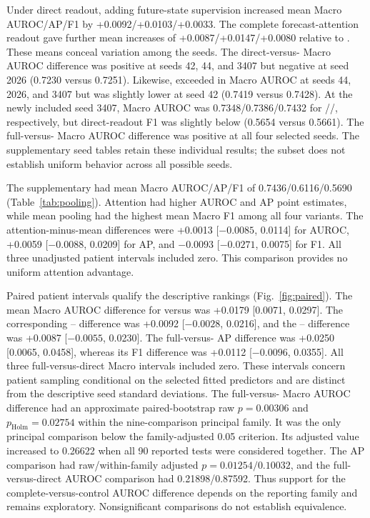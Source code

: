 Under direct readout, adding future-state supervision increased mean Macro AUROC/AP/F1 by +0.0092/+0.0103/+0.0033. The complete forecast-attention readout gave further mean increases of +0.0087/+0.0147/+0.0080 relative to \direct{}. These means conceal variation among the seeds. The direct-versus-\nojepa{} Macro AUROC difference was positive at seeds 42, 44, and 3407 but negative at seed 2026 (0.7230 versus 0.7251). Likewise, \fullmodel{} exceeded \direct{} in Macro AUROC at seeds 44, 2026, and 3407 but was slightly lower at seed 42 (0.7419 versus 0.7428). At the newly included seed 3407, Macro AUROC was 0.7348/0.7386/0.7432 for \nojepa{}/\direct{}/\fullmodel{}, respectively, but direct-readout F1 was slightly below \nojepa{} (0.5654 versus 0.5661). The full-versus-\nojepa{} Macro AUROC difference was positive at all four selected seeds. The supplementary seed tables retain these individual results; the subset does not establish uniform behavior across all possible seeds.

The supplementary \meanmodel{} had mean Macro AUROC/AP/F1 of 0.7436/0.6116/0.5690 (Table~\ref{tab:pooling}). Attention had higher AUROC and AP point estimates, while mean pooling had the highest mean Macro F1 among all four variants. The attention-minus-mean differences were +0.0013 [$-0.0085$, 0.0114] for AUROC, +0.0059 [$-0.0088$, 0.0209] for AP, and $-0.0093$ [$-0.0271$, 0.0075] for F1. All three unadjusted patient intervals included zero. This comparison provides no uniform attention advantage.

Paired patient intervals qualify the descriptive rankings (Fig.~\ref{fig:paired}). The mean Macro AUROC difference for \fullmodel{} versus \nojepa{} was +0.0179 [0.0071, 0.0297]. The corresponding \direct{}--\nojepa{} difference was +0.0092 [$-0.0028$, 0.0216], and the \fullmodel{}--\direct{} difference was +0.0087 [$-0.0055$, 0.0230]. The full-versus-\nojepa{} AP difference was +0.0250 [0.0065, 0.0458], whereas its F1 difference was +0.0112 [$-0.0096$, 0.0355]. All three full-versus-direct Macro intervals included zero. These intervals concern patient sampling conditional on the selected fitted predictors and are distinct from the descriptive seed standard deviations.
The full-versus-\nojepa{} Macro AUROC difference had an approximate paired-bootstrap raw $p=0.00306$ and $p_{\mathrm{Holm}}=0.02754$ within the nine-comparison principal family. It was the only principal comparison below the family-adjusted 0.05 criterion. Its adjusted value increased to 0.26622 when all 90 reported tests were considered together. The AP comparison had raw/within-family adjusted $p=0.01254/0.10032$, and the full-versus-direct AUROC comparison had 0.21898/0.87592. Thus support for the complete-versus-control AUROC difference depends on the reporting family and remains exploratory. Nonsignificant comparisons do not establish equivalence.


